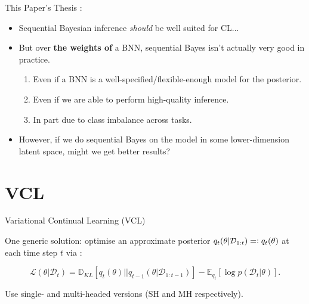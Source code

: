 \documentclass[12pt,aspectratio=169, handout]{beamer}
\let\olditem\item
\renewcommand\item{\olditem\justifying}
\begin{document}
\begin{frame}{This Paper's Thesis}
    \cite{kessler_sequential_2023}:
    \begin{itemize}[<+->]
        \item Sequential Bayesian inference \textit{should} be well suited for CL...
        \item But over \textbf{the weights of} a BNN, sequential Bayes isn't actually very good in practice.
        \begin{enumerate}[<+->]
            \item Even if a BNN is a well-specified/flexible-enough model for the posterior.
            \item Even if we are able to perform high-quality inference.
            \item In part due to class imbalance across tasks.
        \end{enumerate}
        \item However, if we do sequential Bayes on the model in some lower-dimension latent space, might we get better results?
    \end{itemize}

\end{frame}

\section{VCL}
\begin{frame}{Variational Continual Learning (VCL)}

        
    

One generic solution: optimise an approximate posterior $q_t(\theta|\mathcal{D}_{1:t}) = \vcentcolon q_t(\theta)$ at each time step $t$ via \parencite{nguyen_variational_2018}:

\pause
$$\mathcal{L}(\theta | \mathcal{D}_t) = \mathbb{D}_{KL}[q_t(\theta) || q_{t-1}(\theta | \mathcal{D}_{1:t-1})] - \mathbb{E}_{q_t}[\log p(\mathcal{D}_t|\theta)].$$

\pause
Use single- and multi-headed versions (SH and MH respectively).

\end{frame}
\end{document}
